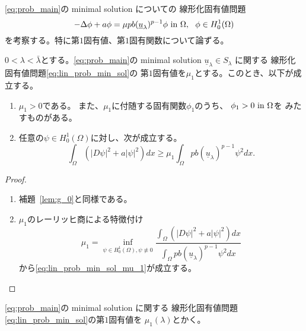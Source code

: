 \ref{eq:prob_main}の minimal solution についての
線形化固有値問題
\begin{equation}
 -\Delta \phi + a \phi = \mu p b (\underline{u}_\lambda)^{p-1} \phi
  ~\text{in}~ \Omega, \ \ \phi \in H_0^1(\Omega) \label{eq:lin_prob_min_sol}
\end{equation}
を考察する。特に第$1$固有値、第$1$固有関数について論ずる。

\begin{lem} \label{lem:lin_p}
 $0 < \lambda < \bar{\lambda}$とする。\ref{eq:prob_main}の
 minimal solution $\underline{u}_\lambda \in S_\lambda$ に関する
 線形化固有値問題\eqref{eq:lin_prob_min_sol}の
 第$1$固有値を$\mu_1$とする。このとき、以下が成立する。
 \begin{enumerate}[1.]
  \item $\mu_1 > 0$である。
        また、$\mu_1$に付随する固有関数$\phi_1$のうち、
        $\phi_1 > 0 ~\text{in}~ \Omega$を
        みたすものがある。
  \item 任意の$\psi \in H_0^1(\Omega)$に対し、次が成立する。
        \begin{equation}
         \int_\Omega \left( \lvert D\psi \rvert^2 + a \lvert \psi
                      \rvert^2 \right)
          dx \geq \mu_1 \int_\Omega pb(\underline{u}_\lambda)^{p-1}
          \psi^2 dx. \label{eq:lin_prob_min_sol_mu_1}
        \end{equation}
 \end{enumerate}
\end{lem}

\begin{proof}
 \begin{enumerate}[1.]
  \item 補題~\ref{lem:g_0}と同様である。
  \item $\mu_1$のレーリッヒ商による特徴付け
        \[
         \mu_1 = \inf_{\psi \in H_0^1(\Omega), \psi \not \equiv 0} 
        \frac{\displaystyle \int_\Omega 
        \left( \left\lvert D\psi \right\rvert^2 + a\lvert\psi\rvert^2 \right)
          dx }{\displaystyle \int_\Omega pb(\underline{u}_\lambda)^{p-1}
          \psi^2 dx }
        \]
        から\eqref{eq:lin_prob_min_sol_mu_1}が成立する。
 \end{enumerate}
\end{proof}

\begin{nota}
 \ref{eq:prob_main}の
 minimal solution に関する
 線形化固有値問題\eqref{eq:lin_prob_min_sol}の第$1$固有値を
 $\mu_1(\lambda)$とかく。
\end{nota}

